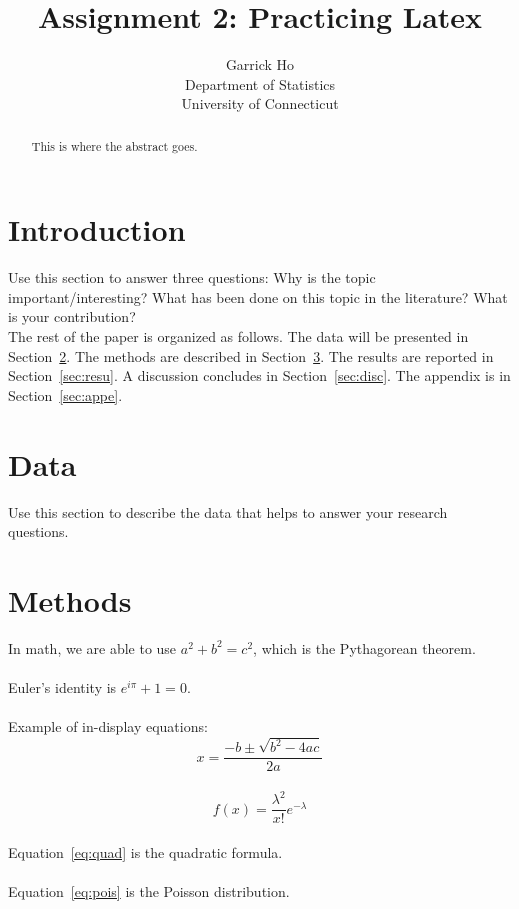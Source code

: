 \documentclass[12pt]{article}
\title{Assignment 2: Practicing Latex}
\author{Garrick Ho \\
Department of Statistics \\
University of Connecticut}
\begin{document}
\maketitle

\begin{abstract}
This is where the abstract goes.
\end{abstract}

\section{Introduction}
\label{sec:intro}

Use this section to answer three questions:
Why is the topic important/interesting? What has been done on this topic in the literature?
What is your contribution?
\\
The rest of the paper is organized as follows.
The data will be presented in Section~\ref{sec:data}.
The methods are described in Section~\ref{sec:meth}.
The results are reported in Section~\ref{sec:resu}.
A discussion concludes in Section~\ref{sec:disc}.
The appendix is in Section~\ref{sec:appe}.

\section{Data}
\label{sec:data}

Use this section to describe the data that helps to answer your research
questions.

\section{Methods}
\label{sec:meth}

In math, we are able to use \(a^2 + b^2 = c^2\), which is the Pythagorean theorem.\\
\\
Euler's identity is \(e^{i{\pi}} + 1 = 0\).\\
\\
Example of in-display equations:
\\
\begin{equation}
  \label{eq:quad}
  x = \frac{-b \pm \sqrt{b^2 - 4ac}}{2a}
\end{equation}
\\
\begin{equation}
  \label{eq:pois}
  f(x) = \frac{\lambda^2}{x!}e^{-\lambda}
\end{equation}
\\
Equation~\ref{eq:quad} is the quadratic formula.\\
\\
Equation~\ref{eq:pois} is the Poisson distribution.
\end{document}
